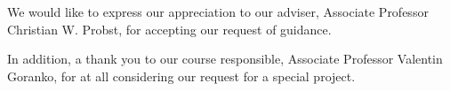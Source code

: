 
We would like to express our appreciation to our adviser, Associate Professor Christian W. Probst, for accepting our request of guidance.

In addition, a thank you to our course responsible, Associate Professor Valentin Goranko, for at all considering our request for a special project.
